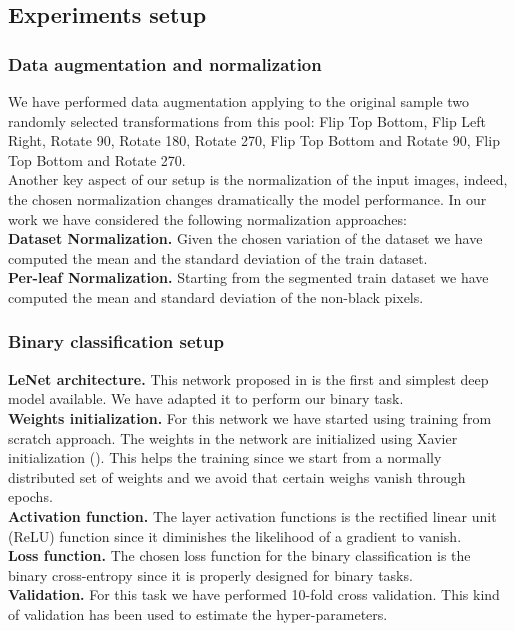 \subsection{Experiments setup}
\subsubsection{Data augmentation and normalization}
We have performed data augmentation applying to the original sample two randomly selected transformations from this pool: Flip Top Bottom, Flip Left Right, Rotate 90\degree, Rotate 180\degree, Rotate 270\degree, Flip Top Bottom and Rotate 90\degree, Flip Top Bottom and Rotate 270\degree.
\\\indent
Another key aspect of our setup is the normalization of the input images, indeed, the chosen normalization changes dramatically the model performance. In our work we have considered the following normalization approaches:
\\
\textbf{Dataset Normalization.} Given the chosen variation of the dataset we have computed the mean and the standard deviation of the train dataset.
\\
\textbf{Per-leaf Normalization.} Starting from the segmented train dataset we have computed the mean and standard deviation of the non-black pixels.
\subsubsection{Binary classification setup}
\textbf{LeNet architecture.} This network proposed in \cite{ref30} is the first and simplest deep model available. We have adapted it to perform our binary task.
\\
\textbf{Weights initialization.} For this network we have started using training from scratch approach. The weights in the network are initialized using Xavier initialization (\cite{ref31}). This helps the training since we start from a normally distributed set of weights and we avoid that certain weighs vanish through epochs.
\\
\textbf{Activation function.}
The layer activation functions is the rectified linear unit (ReLU) function since it diminishes the likelihood of a gradient to vanish.
\\
\textbf{Loss function.}
The chosen loss function for the binary classification is the binary cross-entropy since it is properly designed for binary tasks.
\\
\textbf{Validation.}
For this task we have performed 10-fold cross validation. This kind of validation has been used to estimate the hyper-parameters.
